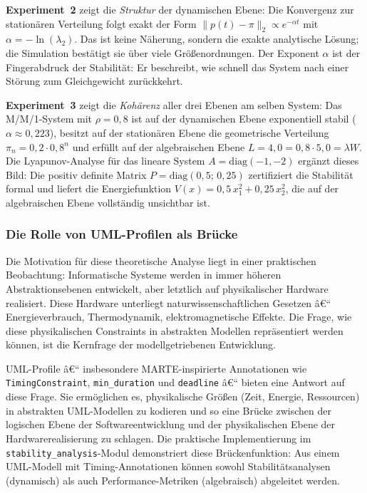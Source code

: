﻿\documentclass[a4paper,12pt]{scrreprt}
\theoremstyle{definition}
\begin{document}
\textbf{Experiment~2} zeigt die \emph{Struktur} der dynamischen Ebene:
Die Konvergenz zur stationären Verteilung folgt exakt der Form
$\|p(t) - \pi\|_2 \propto e^{-\alpha t}$ mit $\alpha = -\ln(\lambda_2)$.
Das ist keine Näherung, sondern die exakte analytische Lösung; die
Simulation bestätigt sie über viele Größenordnungen.  Der Exponent $\alpha$
ist der Fingerabdruck der Stabilität: Er beschreibt, wie schnell das System
nach einer Störung zum Gleichgewicht zurückkehrt.

\textbf{Experiment~3} zeigt die \emph{Kohärenz} aller drei Ebenen am selben
System: Das M/M/1-System mit $\rho = 0{,}8$ ist auf der dynamischen Ebene
exponentiell stabil ($\alpha \approx 0{,}223$), besitzt auf der stationären
Ebene die geometrische Verteilung $\pi_n = 0{,}2 \cdot 0{,}8^n$ und erfüllt
auf der algebraischen Ebene $L = 4{,}0 = 0{,}8 \cdot 5{,}0 = \lambda W$.
Die Lyapunov-Analyse für das lineare System $A = \text{diag}(-1,-2)$
ergänzt dieses Bild: Die positiv definite Matrix $P = \text{diag}(0{,}5;\,
0{,}25)$ zertifiziert die Stabilität formal und liefert die Energiefunktion
$V(x) = 0{,}5\,x_1^2 + 0{,}25\,x_2^2$, die auf der algebraischen Ebene
vollständig unsichtbar ist.

\subsubsection{Die Rolle von UML-Profilen als Brücke}

Die Motivation für diese theoretische Analyse liegt in einer praktischen
Beobachtung: Informatische Systeme werden in immer höheren
Abstraktionsebenen entwickelt, aber letztlich auf physikalischer Hardware
realisiert.  Diese Hardware unterliegt naturwissenschaftlichen Gesetzen â€“
Energieverbrauch, Thermodynamik, elektromagnetische Effekte.  Die Frage,
wie diese physikalischen Constraints in abstrakten Modellen repräsentiert
werden können, ist die Kernfrage der modellgetriebenen Entwicklung.

UML-Profile â€“ insbesondere MARTE-inspirierte Annotationen wie
\texttt{TimingConstraint}, \texttt{min\_duration} und \texttt{deadline} â€“
bieten eine Antwort auf diese Frage.  Sie ermöglichen es, physikalische
Größen (Zeit, Energie, Ressourcen) in abstrakten UML-Modellen zu kodieren
und so eine Brücke zwischen der logischen Ebene der Softwareentwicklung
und der physikalischen Ebene der Hardwarerealisierung zu schlagen.  Die
praktische Implementierung im \texttt{stability\_analysis}-Modul
demonstriert diese Brückenfunktion: Aus einem UML-Modell mit
Timing-Annotationen können sowohl Stabilitätsanalysen (dynamisch) als auch
Performance-Metriken (algebraisch) abgeleitet werden.
\end{document}
